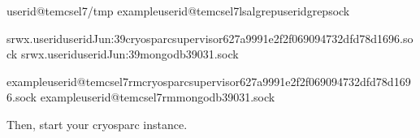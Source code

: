 \documentclass[a4paper,10pt,english]{sphinxmanual}
\begin{document}
\begin{sphinxVerbatim}[commandchars=\\\{\}]
userid@tem\PYGZhy{}cs\PYGZhy{}el7\PYGZdl{}\PYGZgt{}/tmp
exampleuserid@tem\PYGZhy{}cs\PYGZhy{}el7\PYGZdl{}\PYGZgt{}ls\PYGZhy{}algrep\PYGZlt{}userid\PYGZgt{}grepsock

srwx\PYGZhy{}\PYGZhy{}\PYGZhy{}\PYGZhy{}\PYGZhy{}\PYGZhy{}.useriduseridJun:39cryosparc\PYGZhy{}supervisor\PYGZhy{}627a9991e2f2f069094732dfd78d1696.sock
srwx\PYGZhy{}\PYGZhy{}\PYGZhy{}\PYGZhy{}\PYGZhy{}\PYGZhy{}.useriduseridJun:39mongodb\PYGZhy{}39031.sock

exampleuserid@tem\PYGZhy{}cs\PYGZhy{}el7\PYGZdl{}\PYGZgt{}rmcryosparc\PYGZhy{}supervisor\PYGZhy{}627a9991e2f2f069094732dfd78d1696.sock
exampleuserid@tem\PYGZhy{}cs\PYGZhy{}el7\PYGZdl{}\PYGZgt{}rmmongodb\PYGZhy{}39031.sock
\end{sphinxVerbatim}

\sphinxAtStartPar
Then, start your cryosparc instance.
\end{document}
